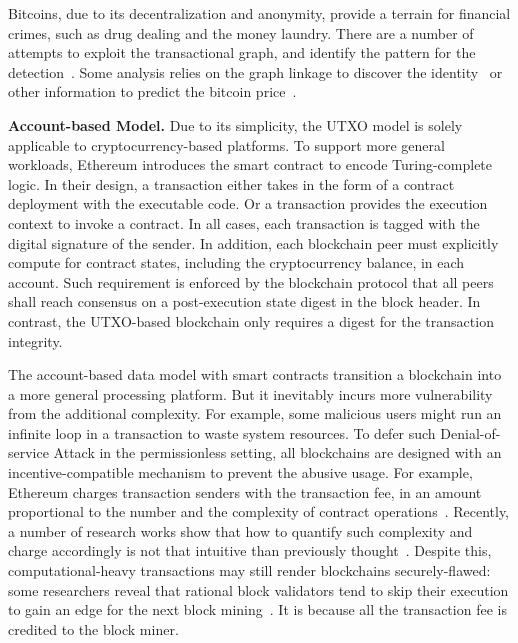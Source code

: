 Bitcoins, due to its decentralization and anonymity, provide a terrain for financial crimes, such as drug dealing and the money laundry. There are a number of attempts to exploit the transactional graph, and identify the pattern for the detection~\cite{fleder2015bitcoin,ron2013quantitative,weber2019anti}. 
Some analysis relies on the graph linkage to discover the identity~\cite{ober2013structure,gaihre2018bitcoin,moser2013anonymity} or other information to predict the bitcoin price~\cite{greaves2015using}. 

\textbf{Account-based Model.}
Due to its simplicity, the UTXO model is solely applicable to cryptocurrency-based platforms. 
To support more general workloads, Ethereum introduces the smart contract to encode Turing-complete logic. 
In their design, a transaction either takes in the form of a contract deployment with the executable code. 
Or a transaction provides the execution context to invoke a contract. 
In all cases, each transaction is tagged with the digital signature of the sender. 
In addition, each blockchain peer must explicitly compute for contract states, including the cryptocurrency balance, in each account. 
Such requirement is enforced by the blockchain protocol that all peers shall reach consensus on a post-execution state digest in the block header. 
In contrast, the UTXO-based blockchain only requires a digest for the transaction integrity.

The account-based data model with smart contracts transition a blockchain into a more general processing platform. 
But it inevitably incurs more vulnerability from the additional complexity. 
For example, some malicious users might run an infinite loop in a transaction to waste system resources. 
To defer such Denial-of-service Attack in the permissionless setting, all blockchains are designed with an incentive-compatible mechanism to prevent the abusive usage. 
For example, Ethereum charges transaction senders with the transaction fee, in an amount proportional to the number and the complexity of contract operations~\cite{wood2014ethereum}.
Recently, a number of research works show that how to quantify such complexity and charge accordingly is not that intuitive than previously thought~\cite{chen2017adaptive,web:txn_spam}. 
Despite this, computational-heavy transactions may still render blockchains securely-flawed: some researchers reveal that rational block validators tend to skip their execution to gain an edge for the next block mining~\cite{luu2015demystifying}.
It is because all the transaction fee is credited to the block miner. 


